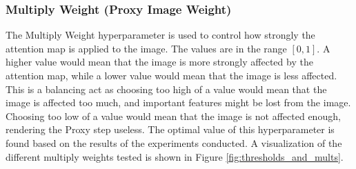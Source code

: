 \documentclass[a4paper,11pt,openright]{book}
\begin{document}
\subsubsection{Multiply Weight (Proxy Image Weight)}
The Multiply Weight hyperparameter is used to control how strongly the attention map is applied to the image. The values are in the range $[0,1]$. A higher value would mean that the image is more strongly affected by the attention map, while a lower value would mean that the image is less affected. This is a balancing act as choosing too high of a value would mean that the image is affected too much, and important features might be lost from the image. Choosing too low of a value would mean that the image is not affected enough, rendering the Proxy step useless. The optimal value of this hyperparameter is found based on the results of the experiments conducted. A visualization of the different multiply weights tested is shown in Figure \ref{fig:thresholds_and_mults}.
\end{document}
